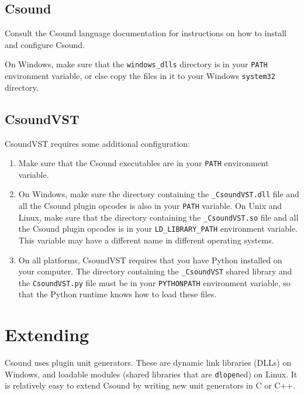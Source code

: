 \documentclass[10pt,letterpaper,onecolumn]{ltxguide}
\begin{document}
\subsection{Csound}

Consult the Csound language documentation for instructions on how to install and configure Csound.

On Windows, make sure that the \texttt{windows\_dlls} directory is in your \texttt{PATH} environment variable, or else copy the files in it to your Windows \texttt{system32} directory. 

\subsection{CsoundVST}
CsoundVST requires some additional configuration:
\begin{enumerate}
\item Make sure that the Csound executables are in your \texttt{PATH} environment variable. 
\item On Windows, make sure the directory containing the \texttt{\_CsoundVST.dll} file and all the Csound plugin opcodes is also in your \texttt{PATH} variable. On Unix and Linux, make sure that the directory containing the \texttt{\_CsoundVST.so} file and all the Csound plugin opcodes is in your \texttt{LD\_LIBRARY\_PATH} environment variable. This variable may have a different name in different operating systems.
\item On all platforms, CsoundVST requires that you have Python installed on your computer. The directory containing the \texttt{\_CsoundVST} shared library and the \texttt{CsoundVST.py} file must be in your \texttt{PYTHONPATH} environment variable, so that the Python runtime knows how to load these files.
\end{enumerate}

\section{Extending}
Csound uses plugin unit generators. These are dynamic link libraries (DLLs) on Windows, and loadable modules (shared libraries that are \texttt{dlopen}ed) on Linux. It is relatively easy to extend Csound by writing new unit generators in C or C++.
\end{document}
